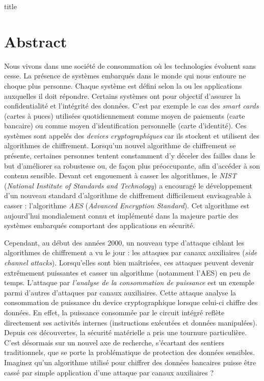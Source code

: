 \documentclass[oneside]{book}
\begin{document}

title
\newpage


{} %
\null\vfil
\section*{\centering Abstract}

Nous vivons dans une société de consommation où les technologies évoluent sans cesse. La présence de systèmes embarqués dans le monde qui nous entoure ne choque plus personne. Chaque système est défini selon la ou les applications auxquelles il doit répondre. Certains systèmes ont pour objectif d'assurer la confidentialité et l'intégrité des données. C'est par exemple le cas des \textit{smart cards} (cartes à puces) utilisées quotidiennement comme moyen de paiements (carte bancaire) ou comme moyen d'identification personnelle (carte d'identité). Ces systèmes sont appelés des \textit{devices cryptographiques} car ils stockent et utilisent des algorithmes de chiffrement. 
Lorsqu'un nouvel algorithme de chiffrement se présente, certaines personnes tentent constamment d'y déceler des failles dans le but d'améliorer sa robustesse ou, de façon plus préoccupante, afin d'accéder à son contenu sensible. Devant cet engouement à casser les algorithmes, le \textit{NIST} (\textit{National Institute of Standards and Technology}) a encouragé le développement d'un nouveau standard d'algorithme de chiffrement difficilement envisageable à casser : l'algorithme \textit{AES} (\textit{Advanced Encryption Standard}). Cet algorithme est aujourd'hui mondialement connu et implémenté dans la majeure partie des systèmes embarqués comportant des applications en sécurité.

Cependant, au début des années 2000, un nouveau type d'attaque ciblant les algorithmes de chiffrement a vu le jour : les attaques par canaux auxiliaires (\textit{side channel attacks}). Lorsqu'elles sont bien maîtrisées, ces attaques peuvent devenir extrêmement puissantes et casser un algorithme (notamment l'AES) en peu de temps. L'attaque par \textit{l'analyse de la consommation de puissance} est un exemple parmi d'autres d'attaques par canaux auxiliaires. Cette attaque analyse la consommation de puissance du device cryptographique lorsque celui-ci chiffre des données. En effet, la puissance consommée par le circuit intégré reflète directement ses activités internes (instructions exécutées et données manipulées).
Depuis ces découvertes, la sécurité matérielle a pris une tournure particulière. C’est désormais sur un nouvel axe de recherche, s’écartant des sentiers traditionnels, que se porte la problématique de protection des données sensibles. Imaginez qu’un algorithme utilisé pour chiffrer des données bancaires puisse être cassé par simple application d’une attaque par canaux auxiliaires ?
\end{document}
